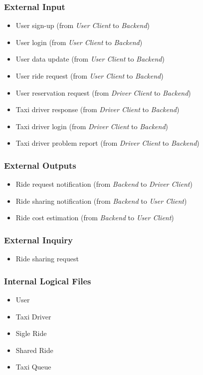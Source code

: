 
\subsubsection{External Input} %
\label{sub:external_inputs}
\begin{itemize}
	\item User sign-up (from \emph{User Client} to \emph{Backend})
	\item User login (from \emph{User Client} to \emph{Backend})
	\item User data update (from \emph{User Client} to \emph{Backend})
	\item User ride request (from \emph{User Client} to \emph{Backend})
	\item User reservation request (from \emph{Driver Client} to \emph{Backend})
	\item Taxi driver response (from \emph{Driver Client} to \emph{Backend})
	\item Taxi driver login (from \emph{Driver Client} to \emph{Backend})
	\item Taxi driver problem report (from \emph{Driver Client} to \emph{Backend})
\end{itemize}

\subsubsection{External Outputs} %
\label{sub:external_outputs}
\begin{itemize}
	\item Ride request notification (from \emph{Backend} to \emph{Driver Client})
	\item Ride sharing notification (from \emph{Backend} to \emph{User Client})
	\item Ride cost estimation (from \emph{Backend} to \emph{User Client})

\end{itemize}

\subsubsection{External Inquiry} %
\label{sub:external_inquiry}
\begin{itemize}
	\item Ride sharing request
\end{itemize}

\subsubsection{Internal Logical Files} %
\label{sub:internal_logical_files}
\begin{itemize}
	\item User
	\item Taxi Driver
	\item Sigle Ride
	\item Shared Ride
	\item Taxi Queue
\end{itemize}

